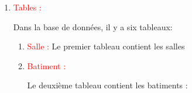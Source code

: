 \documentclass{article}
\begin{document}
\begin{enumerate}
\begin{enumerate}
         
	 \vspace{1cm}
	 
	 \begin{enumerate}
	 \item \textcolor{red}{\large Tables :}
	 
	 
	 
	 Dans la base de données, il y a six tableaux:
	 
	  \begin{enumerate}
	  
	  \vspace{1cm}
	 
	  \item \textcolor{red}{Salle :} 
	  \vspace{1cm}
	  	Le premier tableau contient les salles
	  	
	  	 \hspace*{-1.05in}
               \noindent{}
	  	
	  \vspace{1cm}
	  	
	  \item \textcolor{red}{Batiment :}
	  
	  Le deuxième tableau contient les batiments :
	  
	  \vspace{1cm}
	  

\end{enumerate}
\end{enumerate}
\end{enumerate}
\end{enumerate}
\end{document}
